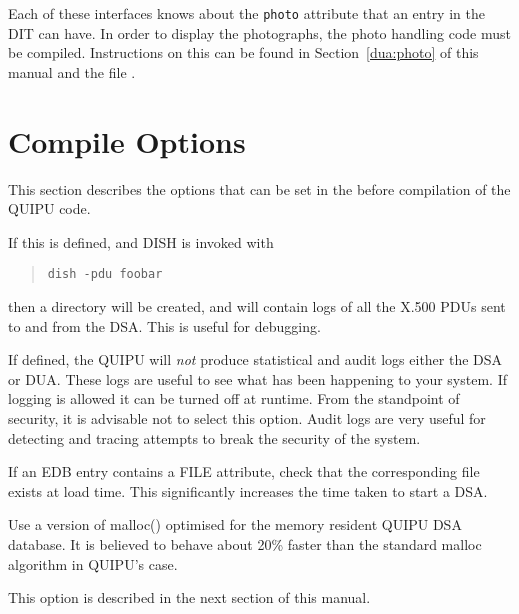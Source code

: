 Each of these interfaces knows about the \verb+photo+ attribute that an entry
in the DIT can have.  In order to display the photographs, the photo
handling code must be compiled. Instructions on this can be found in
Section~\ref{dua:photo} of this manual and the file
.

\section{Compile Options}
\label{DSA:compile}
This section describes the options that can be set in the
 before compilation of the QUIPU code.

\begin{describe}

\item [\verb+\#define PDU\_DUMP+:]
If this is defined, and DISH is invoked with
\begin{quote}\begin{verbatim}
dish -pdu foobar
\end{verbatim}\end{quote}
then a directory  will be created, and 
will contain logs of all the X.500 PDUs sent to and from the DSA.
This is useful for debugging.

\item [\verb+\#define NO\_STATS+:]
If defined, the QUIPU will {\em not} produce statistical
and audit logs either the DSA or DUA.
These logs are useful to see what has been happening to your system.
If logging is allowed it can be turned off at runtime.
From the standpoint of security, it is advisable not
to select this option. Audit logs are very useful for detecting and tracing
attempts to break the security of the system.

\item [\verb+\#define CHECK\_FILE\_ATTRIBUTES+:]
If an EDB entry contains a FILE attribute, check that
the corresponding file exists at load time.  This significantly
increases the time taken to start a DSA.

\item [\verb+\#define QUIPU\_MALLOC+:]
Use a version of malloc() optimised for the memory
resident QUIPU DSA database.  It is believed to behave about 20\%
faster than the standard malloc algorithm in QUIPU's case.

\item [\verb+\#define TURBO\_DISK+:]
This option is described in the next section of this manual.


\end{describe}
